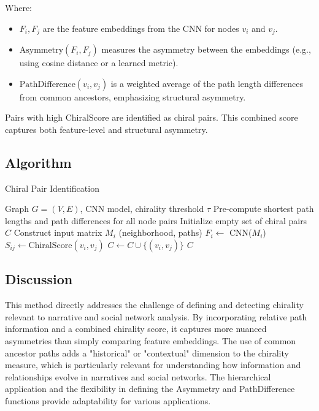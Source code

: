 \documentclass[12pt, a4paper]{article}
\begin{document}
Where:

\begin{itemize}
    \item $F_i, F_j$ are the feature embeddings from the CNN for nodes $v_i$ and $v_j$.
    \item $\text{Asymmetry}(F_i, F_j)$ measures the asymmetry between the embeddings (e.g., using cosine distance or a learned metric).
    \item $\text{PathDifference}(v_i, v_j)$ is a weighted average of the path length differences from common ancestors, emphasizing structural asymmetry.
\end{itemize}

Pairs with high $\text{ChiralScore}$ are identified as chiral pairs. This combined score captures both feature-level and structural asymmetry.

\subsection{Algorithm}

\begin{algorithm}[H]
\caption{Chiral Pair Identification}
\begin{algorithmic}[1]
\Require Graph $G=(V,E)$, CNN model, chirality threshold $\tau$
\State Pre-compute shortest path lengths and path differences for all node pairs
\State Initialize empty set of chiral pairs $C$
    \State Construct input matrix $M_i$ (neighborhood, paths)
    \State $F_i \gets$ CNN($M_i$)
\EndFor
{}
    \State $S_{ij} \gets \text{ChiralScore}(v_i, v_j)$
        \State $C \gets C \cup \{(v_i, v_j)\}$
    \EndIf
\EndFor
\Return $C$
\end{algorithmic}
\end{algorithm}

\subsection{Discussion}

This method directly addresses the challenge of defining and detecting chirality relevant to narrative and social network analysis. By incorporating relative path information and a combined chirality score, it captures more nuanced asymmetries than simply comparing feature embeddings. The use of common ancestor paths adds a "historical" or "contextual" dimension to the chirality measure, which is particularly relevant for understanding how information and relationships evolve in narratives and social networks. The hierarchical application and the flexibility in defining the Asymmetry and PathDifference functions provide adaptability for various applications.
\end{document}
